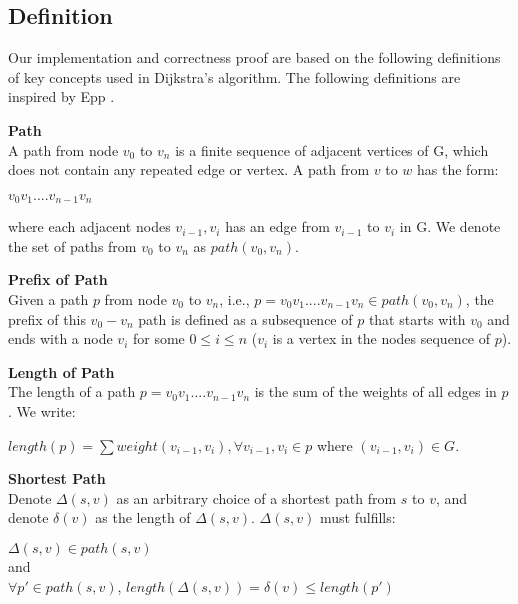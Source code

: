 
\subsection{Definition} \label{definitions}
Our implementation and correctness proof are based on the following definitions of key concepts used in Dijkstra's algorithm. The following definitions are inspired by Epp \cite{discrete}.
\\

\theoremstyle{definition}
\begin{definition}\textbf{Path}\\
A path from node $v_0$ to $v_n$ is a finite sequence of adjacent vertices of G, which does not contain any repeated edge or vertex. A path from $v$ to $w$ has the form: 
\begin{center}
 $v_0v_1....v_{n-1}v_n$ 
\end{center}
where each adjacent nodes $v_{i-1}, v_i$ has an edge from $v_{i-1}$ to $v_i$ in G. We denote the set of paths from $v_0$ to $v_n$ as $path(v_0, v_n)$.
\end{definition}
\tab
\begin{definition}\textbf{Prefix of Path}\\
Given a path $p$ from node $v_0$ to $v_n$, i.e., $p = v_0v_1....v_{n-1}v_n \in path(v_0, v_n)$, the prefix of this $v_0 - v_n$ path is defined as a subsequence of $p$ that starts with $v_0$ and ends with a node $v_i$ for some $0 \leq i \leq n$ ($v_i$ is a vertex in the nodes sequence of $p$). 
\end{definition}
\tab
\begin{definition}\textbf{Length of Path} \\
The length of a path $p = v_0v_1....v_{n-1}v_n$ is the sum of the weights of all edges in $p$. We write: 
\begin{center}
  $length(p) = \sum weight(v_{i-1}, v_i), \forall v_{i-1}, v_i \in p$ where $(v_{i-1}, v_i) \in G$. 
\end{center} 
\end{definition}
\tab
\begin{definition}\textbf{Shortest Path}\\
Denote $\Delta(s, v)$ as an arbitrary choice of a shortest path from $s$ to $v$, and denote $\delta(v)$ as the length of $\Delta(s, v)$. $\Delta(s, v)$ must fulfills: 
\begin{center}
$\Delta(s, v) \in path(s, v)$ 
\\
and 
\\
$\forall p' \in path(s, v)$, $length(\Delta(s, v)) = \delta(v) \leq length(p')$
\end{center}
\end{definition}